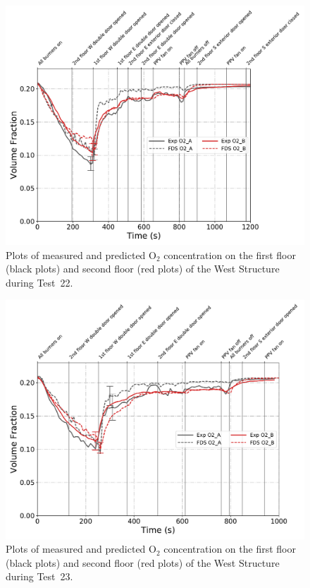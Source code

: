 \begin{figure}[!h]
	\centering
	\includegraphics[width=\columnwidth]{Figures/Plots/Validation/Gas_Concentration/Test_22_O2}
	\caption[Plots of measured and predicted O$_2$ concentration during Test~22.]{Plots of measured and predicted O$_2$ concentration on the first floor (black plots) and second floor (red plots) of the West Structure during Test~22.}
	\label{fig:Test22_O2}
\end{figure}

\begin{figure}[!h]
	\centering
	\includegraphics[width=\columnwidth]{Figures/Plots/Validation/Gas_Concentration/Test_23_O2}
	\caption[Plots of measured and predicted O$_2$ concentration during Test~23.]{Plots of measured and predicted O$_2$ concentration on the first floor (black plots) and second floor (red plots) of the West Structure during Test~23.}
	\label{fig:Test23_O2}
\end{figure}

